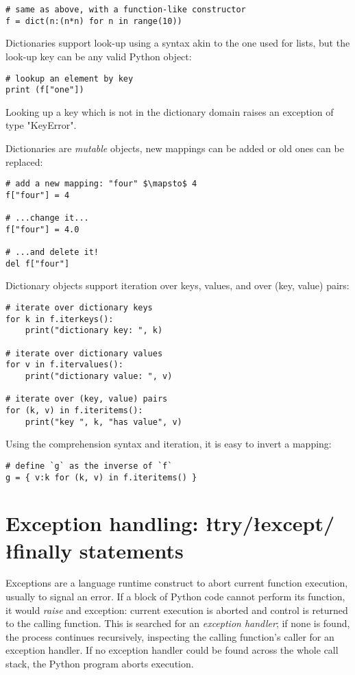 {\begin{lstlisting}
# same as above, with a function-like constructor
f = dict(n:(n*n) for n in range(10))
\end{lstlisting}

Dictionaries support look-up using a syntax akin to the one used for
lists, but the look-up key can be any valid Python object:
\begin{lstlisting}
# lookup an element by key
print (f["one"])
\end{lstlisting}
Looking up a key which is not in the dictionary domain raises an
exception of type "KeyError".

Dictionaries are \emph{mutable} objects, new mappings can be added or
old ones can be replaced:
\begin{lstlisting}
# add a new mapping: "four" $\mapsto$ 4
f["four"] = 4

# ...change it... 
f["four"] = 4.0

# ...and delete it!
del f["four"]
\end{lstlisting}

Dictionary objects support iteration over keys, values, and over (key,
value) pairs:
\begin{lstlisting}
# iterate over dictionary keys
for k in f.iterkeys(): 
    print("dictionary key: ", k)

# iterate over dictionary values
for v in f.itervalues(): 
    print("dictionary value: ", v)

# iterate over (key, value) pairs
for (k, v) in f.iteritems(): 
    print("key ", k, "has value", v)
\end{lstlisting}
Using the comprehension syntax and iteration, it is easy to invert a
mapping:
\begin{lstlisting}
# define `g` as the inverse of `f`
g = { v:k for (k, v) in f.iteritems() }
\end{lstlisting}


\section[Exception handling]{Exception handling: \l{try}/\l{except}/\l{finally} statements}
\label{sec:try-except-finally}

Exceptions are a language runtime construct to abort current function
execution, usually to signal an error.  If a block of Python code
cannot perform its function, it would \emph{raise} and exception:
current execution is aborted and control is returned to the calling
function.  This is searched for an \emph{exception handler}; if none
is found, the process continues recursively, inspecting the calling
function's caller for an exception handler.  If no exception handler
could be found across the whole call stack, the Python program aborts
execution.

}
